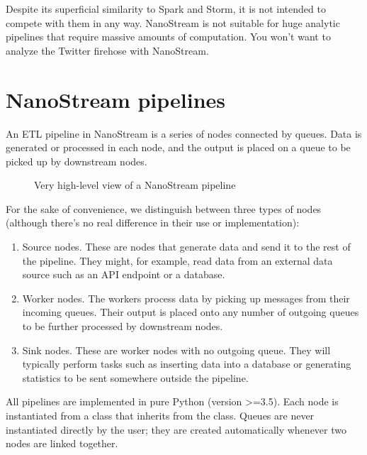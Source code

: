 \documentclass[letterpaper,10pt,english]{sphinxmanual}
\let\sphinxpxdimen\pdfpxdimen\else\newdimen\sphinxpxdimen
\begin{document}
Despite its superficial similarity to Spark and Storm, it is not intended to
compete with them in any way. NanoStream is not suitable for huge analytic
pipelines that require massive amounts of computation. You won’t want to
analyze the Twitter firehose with NanoStream.


\section{NanoStream pipelines}
\label{\detokenize{overview:nanostream-pipelines}}
An ETL pipeline in NanoStream is a series of nodes connected by queues. Data
is generated or processed in each node, and the output is placed on a queue to
be picked up by downstream nodes.

\begin{figure}[htbp]
\centering
\capstart

\noindent\sphinxincludegraphics[width=600\sphinxpxdimen]{{30k_view}.png}
\caption{Very high-level view of a NanoStream pipeline}\label{\detokenize{overview:id1}}\end{figure}

For the sake of convenience, we distinguish between three types of nodes
(although there’s no real difference in their use or implementation):
\begin{enumerate}
\def\theenumi{\arabic{enumi}}
\def\labelenumi{\theenumi .}
\makeatletter\def\p@enumii{\p@enumi \theenumi .}\makeatother
\item {} 
Source nodes. These are nodes that generate data and send it to the rest
of the pipeline. They might, for example, read data from an external
data source such as an API endpoint or a database.

\item {} 
Worker nodes. The workers process data by picking up messages from their
incoming queues. Their output is placed onto any number of outgoing queues
to be further processed by downstream nodes.

\item {} 
Sink nodes. These are worker nodes with no outgoing queue. They will
typically perform tasks such as inserting data into a database or generating
statistics to be sent somewhere outside the pipeline.

\end{enumerate}

All pipelines are implemented in pure Python (version \textgreater{}=3.5). Each node is
instantiated from a class that inherits from the  class. Queues
are never instantiated directly by the user; they are created automatically
whenever two nodes are linked together.
\end{document}
